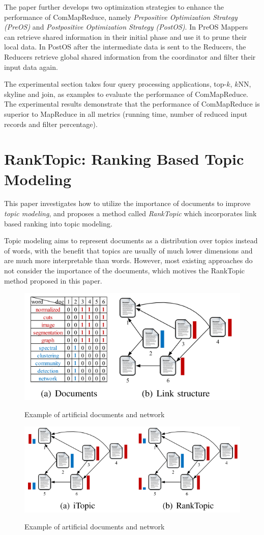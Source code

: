 \documentclass[paper=a4, fontsize=18pt]{article} %
\numberwithin{equation}{section} %
\numberwithin{figure}{section} %
\numberwithin{table}{section} %
\begin{document}
The paper further develops two optimization strategies to enhance the performance of ComMapReduce, namely \emph{Prepositive Optimization Strategy (PreOS)} and \emph{Postpositive Optimization Strategy (PostOS)}. In PreOS Mappers can retrieve shared information in their initial phase and use it to prune their local data. In PostOS after the intermediate data is sent to the Reducers, the Reducers retrieve global shared information from the coordinator and filter their input data again.

The experimental section takes four query processing applications, top-$k$, $k$NN, skyline and join, as examples to evaluate the performance of ComMapReduce. The experimental results demonstrate that the performance of ComMapReduce is superior to MapReduce in all metrics (running time, number of reduced input records and filter percentage).

\section{RankTopic: Ranking Based Topic Modeling \cite{DLLZW12}}

This paper investigates how to utilize the importance of documents to improve \emph{topic modeling}, and proposes a method called \emph{RankTopic} which incorporates link based ranking into topic modeling.

Topic modeling aims to represent documents as a distribution over topics instead of words, with the benefit that topics are usually of much lower dimensions and are much more interpretable than words. However, most existing approaches do not consider the importance of the documents, which motives the RankTopic method proposed in this paper.

\begin{figure}[h]
  \centering
  \includegraphics[width=.5\linewidth]{7_18_doc.png}\\
  \caption{Example of artificial documents and network}\label{fig:docnet}
\end{figure}

\begin{figure}[h]
  \centering
  \includegraphics[width=.5\linewidth]{7_18_topic.png}\\
  \caption{Example of artificial documents and network}\label{fig:topic}
\end{figure}
\end{document}
